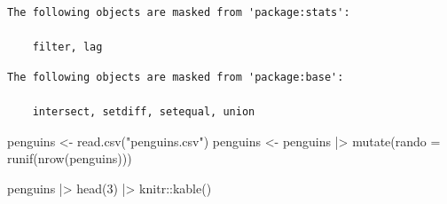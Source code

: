 \documentclass[
  letterpaper,
  DIV=11,
  numbers=noendperiod]{scrreprt}
\newenvironment{Shaded}{\begin{snugshade}}{\end{snugshade}}
\newcommand{\AttributeTok}[1]{\textcolor[rgb]{0.40,0.45,0.13}{#1}}
\newcommand{\DecValTok}[1]{\textcolor[rgb]{0.68,0.00,0.00}{#1}}
\newcommand{\FunctionTok}[1]{\textcolor[rgb]{0.28,0.35,0.67}{#1}}
\newcommand{\NormalTok}[1]{\textcolor[rgb]{0.00,0.23,0.31}{#1}}
\newcommand{\OtherTok}[1]{\textcolor[rgb]{0.00,0.23,0.31}{#1}}
\newcommand{\SpecialCharTok}[1]{\textcolor[rgb]{0.37,0.37,0.37}{#1}}
\newcommand{\StringTok}[1]{\textcolor[rgb]{0.13,0.47,0.30}{#1}}
\begin{document}
\begin{verbatim}
The following objects are masked from 'package:stats':

    filter, lag
\end{verbatim}

\begin{verbatim}
The following objects are masked from 'package:base':

    intersect, setdiff, setequal, union
\end{verbatim}

\begin{Shaded}
\begin{Highlighting}[]
\NormalTok{penguins }\OtherTok{\textless{}{-}} \FunctionTok{read.csv}\NormalTok{(}\StringTok{"penguins.csv"}\NormalTok{)}
\NormalTok{penguins }\OtherTok{\textless{}{-}}\NormalTok{ penguins }\SpecialCharTok{|\textgreater{}} \FunctionTok{mutate}\NormalTok{(}\AttributeTok{rando =} \FunctionTok{runif}\NormalTok{(}\FunctionTok{nrow}\NormalTok{(penguins)))}

\NormalTok{penguins }\SpecialCharTok{|\textgreater{}} \FunctionTok{head}\NormalTok{(}\DecValTok{3}\NormalTok{) }\SpecialCharTok{|\textgreater{}}\NormalTok{ knitr}\SpecialCharTok{::}\FunctionTok{kable}\NormalTok{()}
\end{Highlighting}
\end{Shaded}
\end{document}
